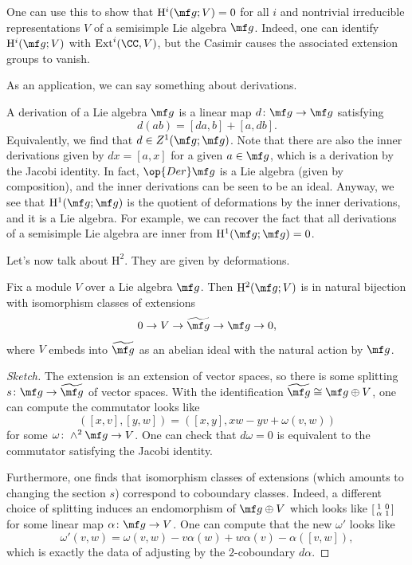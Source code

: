 \documentclass[../notes.tex]{subfiles}
\begin{document}
\begin{remark}
	One can use this to show that $\mathrm H^i(\mf g;V)=0$ for all $i$ and nontrivial irreducible representations $V$ of a semisimple Lie algebra $\mf g$. Indeed, one can identify $\mathrm H^i(\mf g;V)$ with $\mathrm{Ext}^i(\CC,V)$, but the Casimir causes the associated extension groups to vanish.
\end{remark}
As an application, we can say something about derivations.
\begin{example}
	A derivation of a Lie algebra $\mf g$ is a linear map $d\colon\mf g\to\mf g$ satisfying
	\[d(ab)=[da,b]+[a,db].\]
	Equivalently, we find that $d\in Z^1(\mf g;\mf g)$. Note that there are also the inner derivations given by $dx=[a,x]$ for a given $a\in\mf g$, which is a derivation by the Jacobi identity. In fact, $\op{Der}\mf g$ is a Lie algebra (given by composition), and the inner derivations can be seen to be an ideal. Anyway, we see that $\mathrm H^1(\mf g;\mf g)$ is the quotient of deformations by the inner derivations, and it is a Lie algebra. For example, we can recover the fact that all derivations of a semisimple Lie algebra are inner from $\mathrm H^1(\mf g;\mf g)=0$.
\end{example}
Let's now talk about $\mathrm H^2$. They are given by deformations.
\begin{proposition}
	Fix a module $V$ over a Lie algebra $\mf g$. Then $\mathrm H^2(\mf g;V)$ is in natural bijection with isomorphism classes of extensions
	\[0\to V\to\widetilde{\mf g}\to\mf g\to0,\]
	where $V$ embeds into $\widetilde{\mf g}$ as an abelian ideal with the natural action by $\mf g$.
\end{proposition}
\begin{proof}[Sketch]
	The extension is an extension of vector spaces, so there is some splitting $s\colon\mf g\to\widetilde{\mf g}$ of vector spaces. With the identification $\widetilde{\mf g}\cong\mf g\oplus V$, one can compute the commutator looks like
	\[([x,v],[y,w])=([x,y],xw-yv+\omega(v,w))\]
	for some $\omega\colon\land^2\mf g\to V$. One can check that $d\omega=0$ is equivalent to the commutator satisfying the Jacobi identity.
	
	Furthermore, one finds that isomorphism classes of extensions (which amounts to changing the section $s$) correspond to coboundary classes. Indeed, a different choice of splitting induces an endomorphism of $\mf g\oplus V$ which looks like $\begin{bsmallmatrix}
		1 & 0 \\ \alpha & 1
	\end{bsmallmatrix}$ for some linear map $\alpha\colon\mf g\to V$. One can compute that the new $\omega'$ looks like
	\[\omega'(v,w)=\omega(v,w)-v\alpha(w)+w\alpha(v)-\alpha([v,w]),\]
	which is exactly the data of adjusting by the $2$-coboundary $d\alpha$.
\end{proof}
\end{document}
